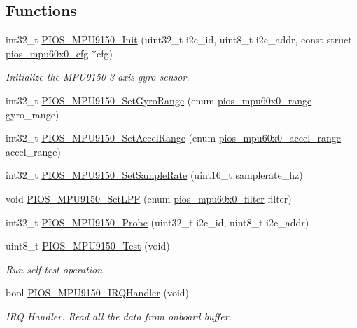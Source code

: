 \subsection*{\-Functions}
\begin{DoxyCompactItemize}
\item 
int32\-\_\-t \hyperlink{group___p_i_o_s___m_p_u9150_ga9f12fde72b74347a0d0212856b50388f}{\-P\-I\-O\-S\-\_\-\-M\-P\-U9150\-\_\-\-Init} (uint32\-\_\-t i2c\-\_\-id, uint8\-\_\-t i2c\-\_\-addr, const struct \hyperlink{structpios__mpu60x0__cfg}{pios\-\_\-mpu60x0\-\_\-cfg} $\ast$cfg)
\begin{DoxyCompactList}\small\item\em \-Initialize the \-M\-P\-U9150 3-\/axis gyro sensor. \end{DoxyCompactList}\item 
int32\-\_\-t \hyperlink{group___p_i_o_s___m_p_u9150_ga4992b96ee80014a7ebc7f651fa0a40e5}{\-P\-I\-O\-S\-\_\-\-M\-P\-U9150\-\_\-\-Set\-Gyro\-Range} (enum \hyperlink{group___p_i_o_s___m_p_u60_x0_ga56700b0154a14cf67c9f8f44a86ad9c0}{pios\-\_\-mpu60x0\-\_\-range} gyro\-\_\-range)
\item 
int32\-\_\-t \hyperlink{group___p_i_o_s___m_p_u9150_gab610f5d4cce3bba688ac2abdcfe48712}{\-P\-I\-O\-S\-\_\-\-M\-P\-U9150\-\_\-\-Set\-Accel\-Range} (enum \hyperlink{group___p_i_o_s___m_p_u60_x0_ga8f297bddae3eb43bbf7b54abc6494992}{pios\-\_\-mpu60x0\-\_\-accel\-\_\-range} accel\-\_\-range)
\item 
int32\-\_\-t \hyperlink{group___p_i_o_s___m_p_u9150_gafcde42bd5efcf63aecc85783d644103e}{\-P\-I\-O\-S\-\_\-\-M\-P\-U9150\-\_\-\-Set\-Sample\-Rate} (uint16\-\_\-t samplerate\-\_\-hz)
\item 
void \hyperlink{group___p_i_o_s___m_p_u9150_gac35235a1e8c79e987cf6995865112d54}{\-P\-I\-O\-S\-\_\-\-M\-P\-U9150\-\_\-\-Set\-L\-P\-F} (enum \hyperlink{group___p_i_o_s___m_p_u60_x0_gacce1988bc994f5ade6ac748c2bf0b924}{pios\-\_\-mpu60x0\-\_\-filter} filter)
\item 
int32\-\_\-t \hyperlink{group___p_i_o_s___m_p_u9150_ga9e6324fa360404c19238ef45e20590f2}{\-P\-I\-O\-S\-\_\-\-M\-P\-U9150\-\_\-\-Probe} (uint32\-\_\-t i2c\-\_\-id, uint8\-\_\-t i2c\-\_\-addr)
\item 
uint8\-\_\-t \hyperlink{group___p_i_o_s___m_p_u9150_ga761368c5db9ceb1a2a5eeaa12fe08703}{\-P\-I\-O\-S\-\_\-\-M\-P\-U9150\-\_\-\-Test} (void)
\begin{DoxyCompactList}\small\item\em \-Run self-\/test operation. \end{DoxyCompactList}\item 
bool \hyperlink{group___p_i_o_s___m_p_u9150_ga543c340540b2b3916748a1be8b94861e}{\-P\-I\-O\-S\-\_\-\-M\-P\-U9150\-\_\-\-I\-R\-Q\-Handler} (void)
\begin{DoxyCompactList}\small\item\em \-I\-R\-Q \-Handler. \-Read all the data from onboard buffer. \end{DoxyCompactList}\end{DoxyCompactItemize}


